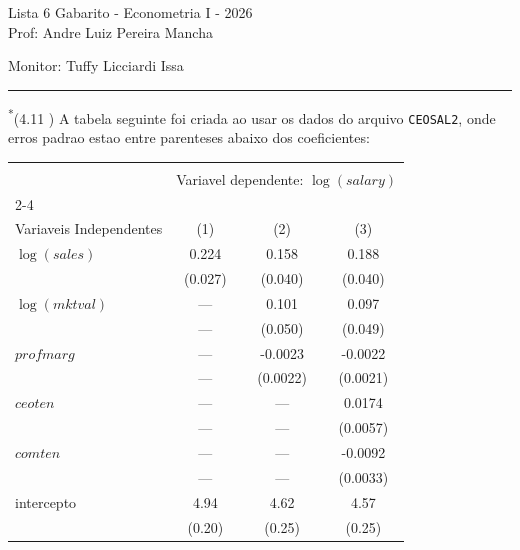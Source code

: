\documentclass[12pt,letterpaper, onecolumn]{exam}
\begin{document}
\begingroup
    \centering
    \LARGE Lista 6 Gabarito - Econometria I - 2026\\[0.5em]
    \large Prof: Andre Luiz Pereira Mancha \par
    \large Monitor: Tuffy Licciardi Issa \par
\endgroup
\rule{\textwidth}{0.4pt}
\pointsdroppedatright
\printanswers
\renewcommand{\solutiontitle}{\noindent\textbf{Ans:}\enspace}
\newcommand{\qstar}{\hspace{-0.6em}\textsuperscript{*}\hspace{0.2em}}

\begin{questions}

\question\qstar (4.11 \citep{wooldridge2016}) A tabela seguinte foi criada ao usar os dados do arquivo \texttt{CEOSAL2}, onde erros padrao estao entre parenteses abaixo dos coeficientes:

\begin{table}[h!]
\centering
\begin{tabular}{lccc}
\toprule
\hline
\\[-1.0ex]
& \multicolumn{3}{c}{Variavel dependente: $\log(salary)$} \\[1.5ex]
\cline{2-4}\\[-1.0ex]
Variaveis Independentes & (1) & (2) & (3) \\[1.5ex]
\hline
$\log(sales)$   & 0.224 & 0.158 & 0.188 \\
                & (0.027) & (0.040) & (0.040) \\[0.2cm]

$\log(mktval)$  & --- & 0.101 & 0.097 \\
                & --- & (0.050) & (0.049) \\[0.2cm]

$profmarg$      & --- & -0.0023 & -0.0022 \\
                & --- & (0.0022) & (0.0021) \\[0.2cm]

$ceoten$        & --- & --- & 0.0174 \\
                & --- & --- & (0.0057) \\[0.2cm]

$comten$        & --- & --- & -0.0092 \\
                & --- & --- & (0.0033) \\[0.2cm]

intercepto      & 4.94 & 4.62 & 4.57 \\
                & (0.20) & (0.25) & (0.25) \\[0.2cm]


\end{tabular}
\end{table}
\end{questions}
\end{document}
